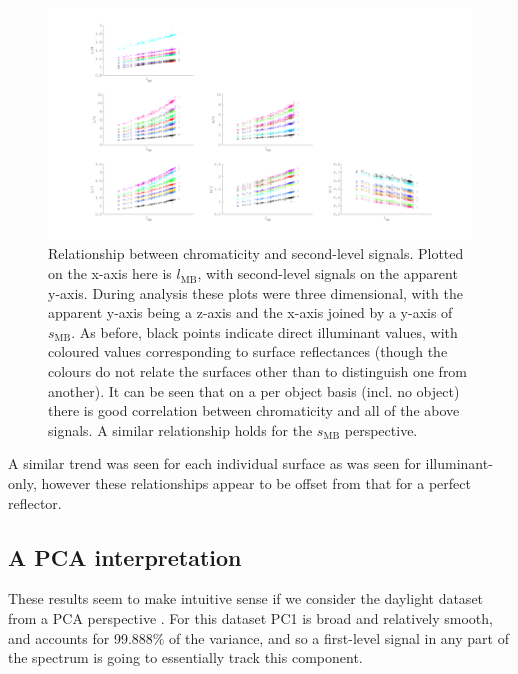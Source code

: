 \begin{figure}
\includegraphics[max width=1.\textwidth]{figs/comp/predictingChromaticity/allComboSignals.pdf}
\caption{Relationship between chromaticity and second-level signals. Plotted on the x-axis here is $l_{\text{MB}}$, with second-level signals on the apparent y-axis. During analysis these plots were three dimensional, with the apparent y-axis being a z-axis and the x-axis joined by a y-axis of $s_{\text{MB}}$. As before, black points indicate direct illuminant values, with coloured values corresponding to surface reflectances (though the colours do not relate the surfaces other than to distinguish one from another). It can be seen that on a per object basis (incl. no object) there is good correlation between chromaticity and all of the above signals. A similar relationship holds for the $s_{\text{MB}}$ perspective.}
\label{fig:allComboSignals}
\end{figure}

A similar trend was seen for each individual surface as was seen for illuminant-only, however these relationships appear to be offset from that for a perfect reflector.

\subsection{A PCA interpretation}

These results seem to make intuitive sense if we consider the daylight dataset from a \gls{PCA} perspective%
. For this dataset \gls{PC1} is broad and relatively smooth, and accounts for 99.888\% of the variance, and so a first-level signal in any part of the spectrum is going to essentially track this component. 

